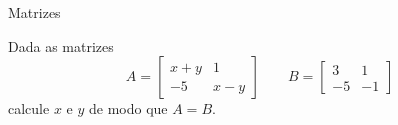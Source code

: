 \begin{exercicios}{Matrizes}
    \begin{exercicio}
        Dada as matrizes
        \[A = \left[\begin{array}{cc}
            x + y &   1   \\
             -5   & x - y
        \end{array} \right]
        \qquad
        B = \left[\begin{array}{rr}
             3 &  1 \\
            -5 & -1
        \end{array} \right]\]
        calcule $x$ e $y$ de modo que $A=B$.
    \end{exercicio}
        
\end{exercicios} %

